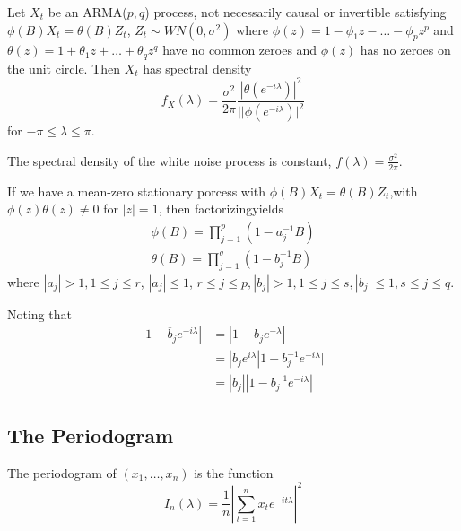 \begin{thm}
  \label{sec:spectral-density-an-3}
  Let $X_{t}$ be an \textsc{ARMA}($p, q$) process, not necessarily causal or
  invertible satisfying $\phi(B)X_{t} = \theta(B) Z_{t}$, $Z_{t} \sim
  WN(0, \sigma^{2})$ where $\phi(z) = 1 - \phi_{1} z - \dots -
  \phi_{p} z^{p}$ and $\theta(z) = 1 + \theta_{1} z + \dots +
  \theta_{q} z^{q}$ have no common zeroes and $\phi(z)$ has no zeroes
  on the unit circle.  Then $X_{t}$ has spectral density
  \begin{equation}
    \label{eq:71}
    f_{X}(\lambda) = \frac{\sigma^{2}}{2 \pi} \frac{|\theta(e^{-i\lambda})|^{2}}{||\phi(e^{-i\lambda})|^{2}}
  \end{equation} for $-\pi \leq \lambda \leq \pi$.
\end{thm}

\begin{thm}
  \label{sec:spectral-density-an-4}
  The spectral density of the white noise process is constant,
  $f(\lambda) = \frac{\sigma^{2}}{2 \pi}$.
\end{thm}

\begin{thm}
  If we have a mean-zero stationary porcess with $\phi(B) X_{t} =
  \theta(B) Z_{t}$,with $\phi(z) \theta(z) \neq 0$ for $|z| = 1$, then
  factorizingyields
  \begin{align}
    \label{eq:80}
    \phi(B) = \prod_{j=1}^{p} (1 - a_{j}^{-1} B) \\
    \theta(B) = \prod_{j=1}^{q} (1-b_{j}^{-1} B)
  \end{align} where $|a_{j} | > 1, 1 \leq j \leq r$, $|a_{j}| \leq 1$,
  $r \leq j \leq p, |b_{j}| > 1, 1 \leq j \leq s, |b_{j}| \leq 1, s
  \leq j \leq q$.

  Noting that
  \begin{align}
    |1 - \overline b_{j} e^{-i\lambda}| &= |1 - b_{j} e^{-\lambda}| \\
    &= |b_{j} e^{i\lambda} | 1 - b_{j}^{-1} e^{-i\lambda}| \\
    &= | b_{j}| | 1 - b_{j}^{-1} e^{-i\lambda}|
  \end{align}
\end{thm}

\subsection{The Periodogram}
\label{sec:periodogram}

\begin{defn}
  \label{sec:periodogram-1}
  The periodogram of $(x_{1}, \dots, x_{n})$ is the function
  \begin{equation}
    \label{eq:74}
    I_{n}(\lambda) = \frac{1}{n} | \sum_{t=1}^{n} x_{t} e^{-it\lambda}|^{2}
  \end{equation}
\end{defn}

